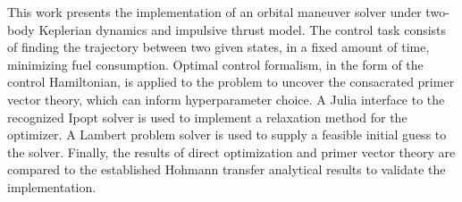 This work presents the implementation of an orbital maneuver solver under two-body Keplerian dynamics and impulsive thrust model. The control task consists of finding the trajectory between two given states, in a fixed amount of time, minimizing fuel consumption. Optimal control formalism, in the form of the control Hamiltonian, is applied to the problem to uncover the consacrated primer vector theory, which can inform hyperparameter choice. A Julia interface to the recognized Ipopt solver is used to implement a relaxation method for the optimizer. A Lambert problem solver is used to supply a feasible initial guess to the solver. Finally, the results of direct optimization and primer vector theory are compared to the established Hohmann transfer analytical results to validate the implementation.